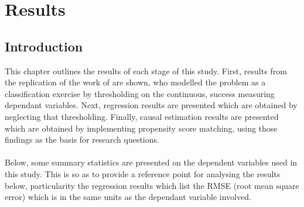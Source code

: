 %
%
%

\chapter{Results}\label{C.Results}

\section{Introduction}\label{S.intro4}
{This chapter outlines the results of each stage of this study. First, results from the replication of the work of \cite{moldovan2015learning} are shown, who modelled the problem as a classification exercise by thresholding on the continuous, success measuring dependant variables. Next, regression results are presented which are obtained by neglecting that thresholding. Finally, causal estimation results are presented which are obtained by implementing propensity score matching, using those findings as the basis for research questions. \\\\
Below, some summary statistics are presented on the dependent variables used in this study. This is so as to provide a reference point for analysing the results below, particularity the regression results which list the RMSE (root mean square error) which is in the same units as the dependant variable involved. 
\begin{table}[h!]
\end{table}

}
